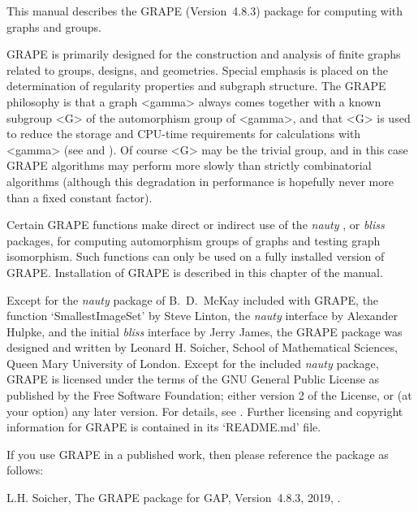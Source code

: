%
%
%
%
\def\GRAPE{\sf GRAPE}
\def\nauty{\it nauty}
\def\bliss{\it bliss}
\def\Aut{{\rm Aut}\,} 


This manual describes the {\GRAPE} (Version~4.8.3) package for computing
with graphs and groups.

{\GRAPE} is primarily designed for the construction and analysis of
finite graphs related to groups, designs, and geometries. Special
emphasis is placed on the determination of regularity properties and
subgraph structure. The {\GRAPE} philosophy is that a graph <gamma>
always comes together with a known subgroup <G> of the automorphism
group of <gamma>, and that <G> is used to reduce the storage and
CPU-time requirements for calculations with <gamma> (see
\cite{Soi93} and \cite{Soi04}).  Of course <G> may be the trivial group,
and in this case {\GRAPE} algorithms may perform more slowly than strictly
combinatorial algorithms (although this degradation in performance is
hopefully never more than a fixed constant factor).

Certain {\GRAPE} functions make direct or indirect use of the {\nauty}
\cite{Nau90}, \cite{MP14} or {\bliss} \cite{JK07} packages, for computing
automorphism groups of graphs and testing graph isomorphism. Such functions
can only be used on a fully installed version of {\GRAPE}. Installation
of {\GRAPE} is described in this chapter of the manual.

Except for the {\nauty} package of B.~D.~McKay included with {\GRAPE},
the function `SmallestImageSet' by Steve Linton, the {\nauty} interface
by Alexander Hulpke, and the initial {\bliss} interface by Jerry James,
the {\GRAPE} package was designed and written by Leonard H. Soicher,
School of Mathematical Sciences, Queen Mary University of London.
Except for the included {\nauty} package, {\GRAPE} is licensed under the
terms of the GNU General Public License as published by the Free Software
Foundation; either version 2 of the License, or (at your option) any later
version. For details, see .
Further licensing and copyright information for {\GRAPE} is contained
in its `README.md' file.

If you use {\GRAPE} in a published work, then please reference the
package as follows:

L.H. Soicher, The {GRAPE} package for {GAP}, Version~4.8.3, 2019,
.

